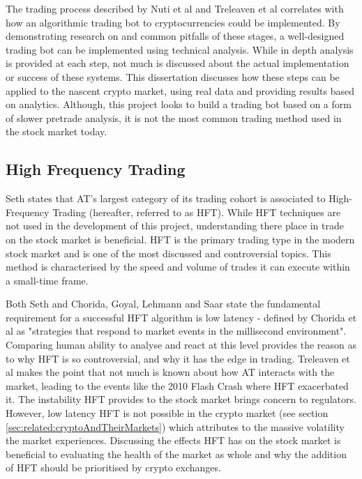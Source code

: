 The trading process described by Nuti et al \cite{ART:Nuti:2011} and Treleaven et al \cite{ART:Treleaven:2013} correlates with how an algorithmic trading bot to cryptocurrencies could be implemented. By demonstrating research on and common pitfalls of these stages, a well-designed trading bot can be implemented using technical analysis. While in depth analysis is provided at each step, not much is discussed about the actual implementation or success of these systems. This dissertation discusses how these steps can be applied to the nascent crypto market, using real data and providing results based on analytics. Although, this project looks to build a trading bot based on a form of slower pretrade analysis, it is not the most common trading method used in the stock market today. 

\subsection{High Frequency Trading}
\label{sec:related:algoTrading:HFT}
\noindent  Seth \cite{WEB:SETH:0001} states that AT's largest category of its trading cohort is associated to High-Frequency Trading (hereafter, referred to as HFT). While HFT techniques are not used in the development of this project, understanding there place in trade on the stock market is beneficial. HFT is the primary trading type in the modern stock market and is one of the most discussed and controversial topics. This method is characterised by the speed and volume of trades it can execute within a small-time frame.

Both Seth \cite{WEB:SETH:0001} and Chorida, Goyal, Lehmann and Saar \cite{REPORT:ChordiaEtAl:2013} state the fundamental requirement for a successful HFT algorithm is low latency - defined by Chorida et al as "strategies that respond to market events in the millisecond environment". Comparing human ability to analyse and react at this level provides the reason as to why HFT is so controversial, and why it has the edge in trading. Treleaven et al \cite{ART:Treleaven:2013} makes the point that not much is known about how AT interacts with the market, leading to the events like the 2010 Flash Crash where HFT exacerbated it. The instability HFT provides to the stock market brings concern to regulators. However, low latency HFT is not possible in the crypto market (see section \ref{sec:related:cryptoAndTheirMarkets}) which attributes to the massive volatility the market experiences. Discussing the effects HFT has on the stock market is beneficial to evaluating the health of the market as whole and why the addition of HFT should be prioritised by crypto exchanges.

